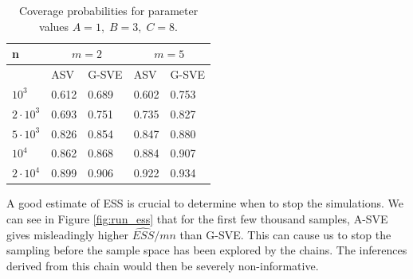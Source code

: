 \documentclass[11pt]{article}
\theoremstyle{remark}
\begin{document}
\begin{table}[h]
\centering
    \begin{tabular}{p{1cm}|p{2cm}|p{2cm}|p{2cm}|p{2cm}}
        n & \multicolumn{2}{|c|}{$m = 2$} & \multicolumn{2}{|c|}{$m=5$}\\
        \hline
        & ASV & G-SVE & ASV & G-SVE\\
        \hline
        $10^3$ & 0.612 & 0.689 & 0.602 & 0.753   \\
        $2\cdot10^3$ & 0.693 & 0.751 & 0.735 & 0.827 \\
        $5 \cdot 10^3$  & 0.826 & 0.854 & 0.847 & 0.880 \\
        $10^4$  & 0.862 & 0.868 & 0.884 & 0.907 \\
        $2 \cdot 10^4$ & 0.899 & 0.906 & 0.922 & 0.934  \\
    \end{tabular}
    \caption{Coverage probabilities for parameter values $A = 1,\; B = 3,\; C = 8$. }
    \label{table:boom-coverage_1_3_8}
\end{table}

A good estimate of ESS is crucial to determine when to stop the simulations. We can see in Figure \ref{fig:run_ess} that for the first few thousand samples, A-SVE gives misleadingly higher $\hat{ESS}/mn$ than G-SVE. This can cause us to stop the sampling before the sample space has been explored by the chains. The inferences derived from this chain would then be severely non-informative.
\end{document}
